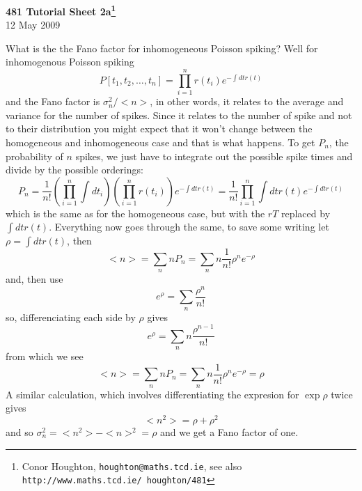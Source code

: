 \documentclass[12pt]{article}
\begin{document}
\begin{center}
{\bf 481 Tutorial Sheet 2a\footnote{Conor Houghton, {\tt houghton@maths.tcd.ie}, see also {\tt http://www.maths.tcd.ie/ houghton/481}}}\\[1cm]{} 12 May 2009
\end{center}

What is the the Fano factor for inhomogeneous Poisson spiking? Well for inhomogenous Poisson spiking
\begin{equation}
P[t_1,t_2,\ldots,t_n]=\prod_{i=1}^nr(t_i)e^{-\int dt r(t)}
\end{equation}
and the Fano factor is $\sigma_n^2/<n>$, in other words, it relates to
the average and variance for the number of spikes. Since it relates to
the number of spike and not to their distribution you might expect
that it won't change between the homogeneous and inhomogeneous case
and that is what happens. To get $P_n$, the probability of $n$ spikes,
we just have to integrate out the possible spike times and divide by the possible orderings:
\begin{equation}
P_n=\frac{1}{n!}\left(\prod_{i=1}^n\int dt_i\right)\left(\prod_{i=1}^nr(t_i)\right)e^{-\int dt r(t)}=\frac{1}{n!}\prod_{i=1}^n\int dt r(t)e^{-\int dt r(t)}
\end{equation}
which is the same as for the homogeneous case, but with the $rT$ replaced by $\int dt r(t)$. Everything now goes through the same, to save some writing let $\rho=\int dtr(t)$, then
\begin{equation}
<n>=\sum_n nP_n= \sum_n n\frac{1}{n!}\rho^n e^{-\rho}
\end{equation}
and, then use 
\begin{equation}
e^\rho=\sum_n \frac{\rho^n}{n!} 
\end{equation} 
so, differenciating each side by $\rho$ gives
\begin{equation}
e^\rho=\sum_n n\frac{\rho^{n-1}}{n!}
\end{equation}
from which we see
\begin{equation}
<n>=\sum_n nP_n= \sum_n n\frac{1}{n!}\rho^n e^{-\rho}=\rho
\end{equation}
A similar calculation, which involves differentiating the expresion for $\exp{\rho}$ twice gives
\begin{equation}
<n^2>=\rho+\rho^2
\end{equation}
and so $\sigma_n^2=<n^2>-<n>^2=\rho$ and we get a Fano factor of one.
\end{document}
